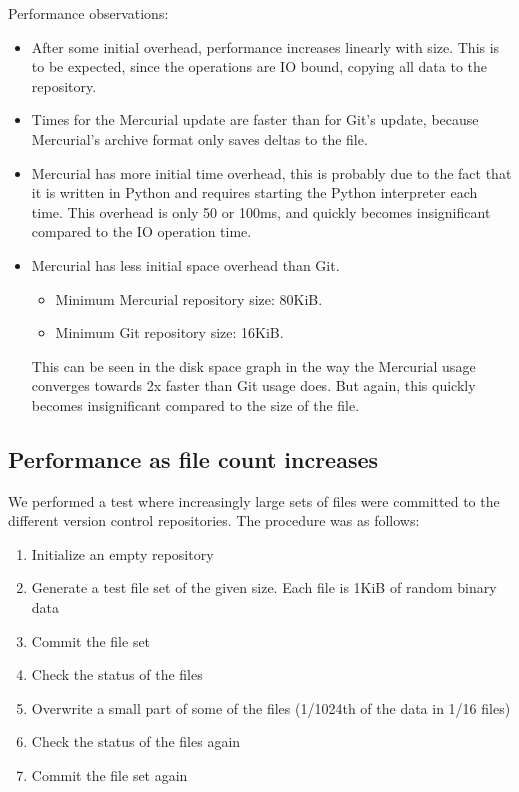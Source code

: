 \documentclass[a4paper]{article}
\begin{document}
Performance observations:

\begin{itemize}

    \item After some initial overhead, performance increases linearly with size.
        This is to be expected, since the operations are IO bound, copying all
        data to the repository.

    \item Times for the Mercurial update are faster than for Git's update,
        because Mercurial's archive format only saves deltas to the file.

    \item Mercurial has more initial time overhead, this is probably due to the
        fact that it is written in Python and requires starting the Python
        interpreter each time. This overhead is only 50 or 100ms, and quickly
        becomes insignificant compared to the IO operation time.

    \item Mercurial has less initial space overhead than Git.

        \begin{itemize}
            \setlength{\itemsep}{0pt}
            \setlength{\parskip}{0pt}
            \setlength{\parsep}{0pt}
            \item Minimum Mercurial repository size: 80KiB.
            \item Minimum Git repository size: 16KiB.
        \end{itemize}

        This can be seen in the disk space graph in the way the Mercurial usage
        converges towards 2x faster than Git usage does. But again, this quickly
        becomes insignificant compared to the size of the file.

\end{itemize}

\subsection{Performance as file count increases}

We performed a test where increasingly large sets of files were committed to the
different version control repositories. The procedure was as follows:

\begin{enumerate}
    \setlength{\itemsep}{0pt}
    \setlength{\parskip}{0pt}
    \setlength{\parsep}{0pt}
    \item Initialize an empty repository
    \item Generate a test file set of the given size. Each file is 1KiB of
        random binary data
    \item Commit the file set
    \item Check the status of the files
    \item Overwrite a small part of some of the files (1/1024th of the data in
        1/16 files)
    \item Check the status of the files again
    \item Commit the file set again
\end{enumerate}
\end{document}
